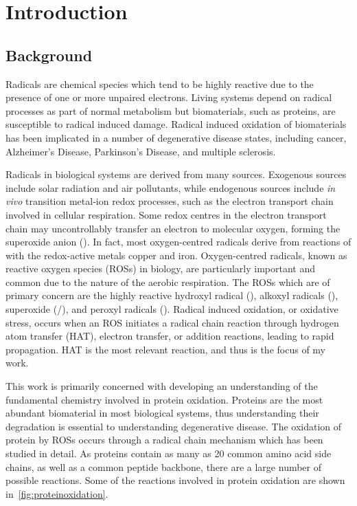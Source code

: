 
\chapter{Introduction}

\section{Background}

Radicals are chemical species which tend to be highly reactive due to the presence of one or more unpaired electrons. Living systems depend on radical processes as part of normal metabolism\cite{Halliwell2015} but biomaterials, such as proteins, are susceptible to radical induced damage. Radical induced oxidation of biomaterials has been implicated in a number of degenerative disease states, including cancer, Alzheimer's Disease, Parkinson's Disease, and multiple sclerosis.\cite{Barnham2004, Valko2007, Hwang2013, Halliwell2007}

Radicals in biological systems are derived from many sources. Exogenous sources include solar radiation and air pollutants, while endogenous sources include \emph{in vivo} transition metal-ion redox processes, such as the electron transport chain involved in cellular respiration.\cite{Turrens2003}
Some redox centres in the electron transport chain may uncontrollably transfer an electron to molecular oxygen, forming the superoxide anion (). In fact, most oxygen-centred radicals derive from reactions of  with the redox-active metals copper and iron.\cite{Halliwell2015} Oxygen-centred radicals, known as reactive oxygen species (ROSs) in biology, are particularly important and common due to the nature of the aerobic respiration. The ROSs which are of primary concern are the highly reactive hydroxyl radical (), alkoxyl radicals (), superoxide (/), and peroxyl radicals ().\cite{Halliwell2015} Radical induced oxidation, or oxidative stress, occurs when an ROS initiates a radical chain reaction through hydrogen atom transfer (HAT), electron transfer, or addition reactions, leading to rapid propagation. HAT is the most relevant reaction, and thus is the focus of my work.

This work is primarily concerned with developing an understanding of the fundamental chemistry involved in protein oxidation. Proteins are the most abundant biomaterial in most biological systems,\cite{Davies2005} thus understanding their degradation is essential to understanding degenerative disease. The oxidation of protein by ROSs occurs through a radical chain mechanism which has been studied in detail.\cite{Berlett1997, Davies2016} As proteins contain as many as 20 common amino acid side chains, as well as a common peptide backbone, there are a large number of possible reactions.  Some of the reactions involved in protein oxidation are shown in~\ref{fig:proteinoxidation}.

